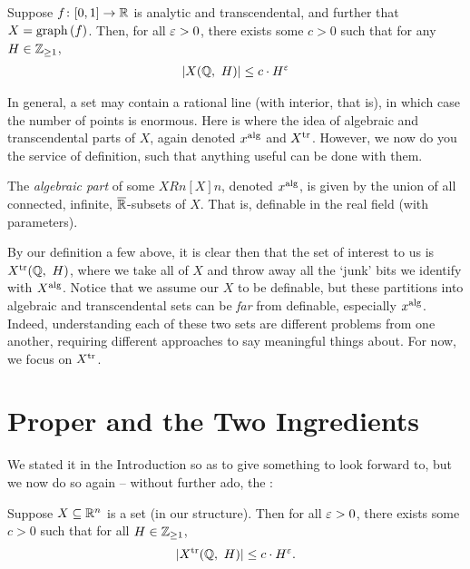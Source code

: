 \begin{theorem}
  Suppose $\funcdom{f}{[0, 1]}{\R}$ is analytic and transcendental, and further that $X = \graph{f}$. Then, for all $\eps > 0$, there exists some $c > 0$ such that for any $H \in \Zgeq{1}$,
    \begin{align*}
      \card{\XQH[H]} \leq c \cdot H^{\eps}
    \end{align*}
\end{theorem}

In general, a  set may contain a rational line (with interior, that is), in which case the number of points is enormous. Here is where the idea of algebraic and transcendental parts of $X$, again denoted $\Xalg[x]$ and $\Xtr[X]$. However, we now do you the service of definition, such that anything useful can be done with them.

\begin{definition}
  The \emph{algebraic part} of some $XRn[X]{n}$, denoted $\Xalg[x]$, is given by the union of all connected, infinite, $\overline{\R}$- subsets of $X$. That is, definable in the real field (with parameters).
\end{definition}

By our definition a few above, it is clear then that the set of interest to us is $\XtrQH[H]$, where we take all of $X$ and throw away all the `junk' bits we identify with $\Xalg[X]$. Notice that we assume our $X$ to be definable, but these partitions into algebraic and transcendental sets can be \emph{far} from definable, especially $\Xalg[x]$. Indeed, understanding each of these two sets are different problems from one another, requiring different approaches to say meaningful things about. For now, we focus on $\Xtr[X]$.

\section{\pw Proper and the Two Ingredients}

We stated it in the Introduction so as to give something to look forward to, but we now do so again -- without further ado, the \pwt:

  \begin{theorem}
    Suppose $\XRn[X]{n}$ is a  set (in our \om structure). Then for all $\eps > 0$, there exists some $c > 0$ such that for all $H \in \Zgeq{1}$,
      \begin{align*}
        \card{\XtrQH[H]} \leq c \cdot H^{\eps}.
      \end{align*}
      \label{thm:pwt}
  \end{theorem}

